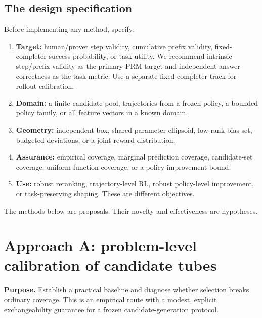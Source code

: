 \subsection{The design specification}
Before implementing any method, specify:
\begin{enumerate}
\item \textbf{Target:} human/prover step validity, cumulative prefix validity,
fixed-completer success probability, or task utility. We recommend intrinsic
step/prefix validity as the primary PRM target and independent answer correctness
as the task metric. Use a separate fixed-completer track for rollout calibration.
\item \textbf{Domain:} a finite candidate pool, trajectories from a frozen
policy, a bounded policy family, or all feature vectors in a known domain.
\item \textbf{Geometry:} independent box, shared parameter ellipsoid,
low-rank bias set, budgeted deviations, or a joint reward distribution.
\item \textbf{Assurance:} empirical coverage, marginal prediction coverage,
candidate-set coverage, uniform function coverage, or a policy improvement bound.
\item \textbf{Use:} robust reranking, trajectory-level RL, robust policy-level
improvement, or task-preserving shaping. These are different objectives.
\end{enumerate}
The methods below are proposals. Their novelty and effectiveness are hypotheses.

\section{Approach A: problem-level calibration of candidate tubes}
\label{sec:approachA}
\textbf{Purpose.} Establish a practical baseline and diagnose whether selection
breaks ordinary coverage. This is an empirical route with a modest, explicit
exchangeability guarantee for a frozen candidate-generation protocol.

